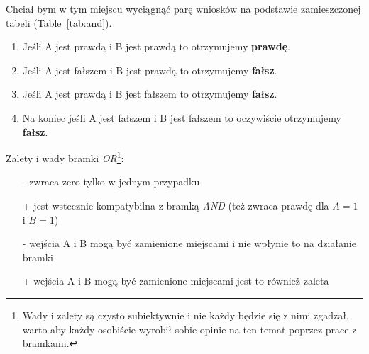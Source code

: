 \newpage

Chciał bym w tym miejscu wyciągnąć parę wniosków na podstawie zamieszczonej tabeli (Table~\ref{tab:and}). 
\begin{enumerate}
    \item Jeśli A jest prawdą i B jest prawdą to otrzymujemy \textbf{prawdę}.
    \item Jeśli A jest fałszem i B jest prawdą to otrzymujemy \textbf{fałsz}. 
    \item Jeśli A jest prawdą i B jest fałszem to otrzymujemy \textbf{fałsz}. 
    \item Na koniec jeśli A jest fałszem i B jest fałszem to oczywiście otrzymujemy \textbf{fałsz}. 
\end{enumerate}



Zalety i wady bramki \emph{OR}\footnote{Wady i zalety są czysto subiektywnie i nie każdy będzie się z nimi zgadzał, warto aby każdy osobiście wyrobił sobie opinie na ten temat poprzez prace z bramkami.}:
\begin{itemize}
    \item[-] zwraca zero tylko w jednym przypadku
    \item[+] jest wstecznie kompatybilna z bramką \emph{AND} (też zwraca prawdę dla $A=1$ i $B=1$)
    \item[-] wejścia A i B mogą być zamienione miejscami i nie wpłynie to na działanie bramki
    \item[+] wejścia A i B mogą być zamienione miejscami jest to również zaleta
\end{itemize}





